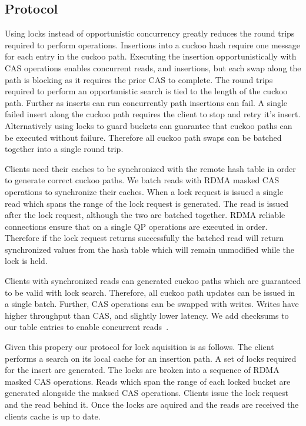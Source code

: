 \subsection{Protocol}

Using locks instead of opportunistic concurrency greatly
reduces the round trips required to perform operations.
Insertions into a cuckoo hash require one message for each
entry in the cuckoo path. Executing the insertion
opportunistically with CAS operations enables concurrent
reads, and insertions, but each swap along the path is
blocking as it requires the prior CAS to complete. The round
trips required to perform an opportunistic search is tied to
the length of the cuckoo path. Further as inserts can run
concurrently path insertions can fail. A single failed
insert along the cuckoo path requires the client to stop and
retry it's insert. Alternatively using locks to guard
buckets can guarantee that cuckoo paths can be executed
without failure. Therefore all cuckoo path swaps can be
batched together into a single round trip.

Clients need their caches to be synchronized with the remote
hash table in order to generate correct cuckoo paths. We
batch reads with RDMA masked CAS operations to synchronize
their caches. When a lock request is issued a single read
which spans the range of the lock request is generated. The
read is issued after the lock request, although the two are
batched together. RDMA reliable connections ensure that on a
single QP operations are executed in order. Therefore if the
lock request returns successfully the batched read will
return synchronized values from the hash table which will
remain unmodified while the lock is held.

Clients with synchronized reads can generated cuckoo paths
which are guaranteed to be valid with lock search.
Therefore, all cuckoo path updates can be issued in a single
batch. Further, CAS operations can be swapped with writes.
Writes have higher throughput than CAS, and slightly lower
latency. We add checksums to our table entries to enable
concurrent reads~\cite{pilaf,cell}.  ~

Given this propery our protocol for lock aquisition is as
follows. The client performs a search on its local cache for
an insertion path. A set of locks required for the insert
are generated. The locks are broken into a sequence of RDMA
masked CAS operations. Reads which span the range of each
locked bucket are generated alongside the maksed CAS
operations. Clients issue the lock request and the read
behind it. Once the locks are aquired and the reads are
received the clients cache is up to date.

